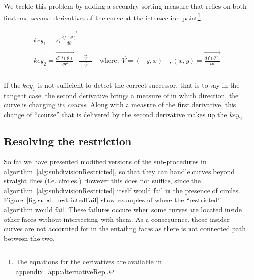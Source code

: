 We tackle this problem by adding a secondry sorting measure that relies on both first and second derivatives of the curve at the intersection point\footnote{The equations for the derivatives are available in appendix~\ref{app:alternativeRep}.}.

\[
\begin{array}{l}
  key_1 = \measuredangle \overrightarrow{\frac{d\dot{f}(\theta)}{d\theta}}\\
  \quad\\
  key_2 = \overrightarrow{\frac{d^2\dot{f}(\theta)}{d\theta^2}} \cdot \frac{\overrightarrow{V}}{\|\overrightarrow{V}\|} \quad \text{where: } \overrightarrow{V} = (-y,x) \quad , (x,y) = \overrightarrow{\frac{d\dot{f}(\theta)}{d\theta}}\\
\end{array}
\]

If the $key_1$ is not sufficient to detect the correct successor, that is to say in the tangent case,
the second derivative brings a measure of in which direction, the curve is changing its \emph{course}.
Along with a measure of the first derivative, this change of ``course'' that is delivered by the second derivative makes up the $key_2$.

\subsection{Resolving the restriction} \label{subsec:}

So far we have presented modified versions of the sub-procedures in algorithm~\ref{alg:subdivisionRestricted}, so that they can handle curves beyond straight lines (i.e. circles.)
However this does not suffice, since the algorithm~\ref{alg:subdivisionRestricted} itself would fail in the presence of circles.
Figure~\ref{fig:subd_restrictedFail} show examples of where the ``restricted'' algorithm would fail.
These failures occure when some curves are located inside other faces without intersecting with them.
As a consequence, those insider curves are not accounted for in the entailing faces as there is not connected path between the two.

